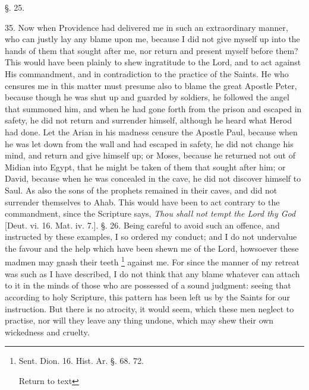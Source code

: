 §. 25.

35. Now when Providence had delivered me in such
an extraordinary manner, who can justly lay any blame upon me, because
I did not give myself up into the hands of them that sought after me,
nor return and present myself before them? This would have been
plainly to shew ingratitude to the Lord, and to act against His
commandment, and in contradiction to the practice of the Saints. He
who censures me in this matter must presume also to blame the great
Apostle Peter, because though he was shut up and guarded by soldiers,
he followed the angel that summoned him, and when he had gone forth
from the prison and escaped in safety, he did not return and surrender
himself, although he heard what Herod had done. Let the Arian in his
madness censure the Apostle Paul, because when he was let down from
the wall and had escaped in safety, he did not change his mind, and
return and give himself up; or Moses, because he returned not out of
Midian into Egypt, that he might be taken of them that sought after
him; or David, because when he was concealed in the cave, he did not
discover himself to Saul. As also the sons of the prophets remained in
their caves, and did not surrender themselves to Ahab. This would have
been to act contrary to the commandment, since the Scripture says, \emph{Thou
shall not tempt the Lord thy God} [Deut. vi. 16. Mat. iv. 7.]. §.
26. Being careful to avoid such an offence, and instructed by these
examples, I so ordered my conduct; and I do not undervalue the favour
and the help which have been shewn me of the Lord, howsoever these
madmen may gnash their teeth \footnote{Sent. Dion. 16. Hist. Ar. §. 68. 72.

Return to text} against
me. For since the manner of my retreat was such as I have described, I
do not think that any blame whatever can attach to it in the minds of
those who are possessed of a sound judgment: seeing that according to
holy Scripture, this pattern has been left us by the Saints for our
instruction. But there is no atrocity, it would seem, which these men
neglect to practise, nor will they leave any thing undone, which may
shew their own wickedness and cruelty.

